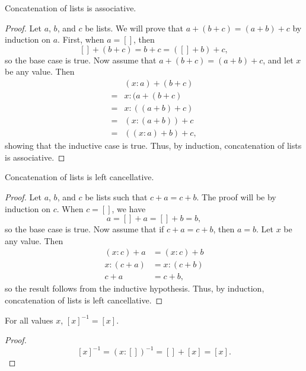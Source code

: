 \documentclass[../../math.tex]{subfiles}
\begin{document}
\begin{instance}
    Concatenation of lists is associative.
\end{instance}
\begin{proof}
    Let $a$, $b$, and $c$ be lists.  We will prove that $a + (b + c) =
    (a + b) + c$ by induction on $a$.  First, when $a = []$, then
    \[
        [] + (b + c) = b + c = ([] + b) + c,
    \]
    so the base case is true.  Now assume that $a + (b + c) = (a +
    b) + c$, and let $x$ be any value.  Then
    \begin{align*}
        &(x : a) + (b + c) \\
        ={}& x : (a + (b + c) \\
        ={}& x : ((a + b) + c) \\
        ={}& (x : (a + b)) + c \\
        ={}& ((x : a) + b) + c,
    \end{align*}
    showing that the inductive case is true.  Thus, by induction, concatenation
    of lists is associative.
\end{proof}

\begin{instance}
    Concatenation of lists is left cancellative.
\end{instance}
\begin{proof}
    Let $a$, $b$, and $c$ be lists such that $c + a = c + b$.  The proof will be
    by induction on $c$.  When $c = []$, we have
    \[
        a = [] + a = [] + b = b,
    \]
    so the base case is true.  Now assume that if $c + a = c + b$, then $a = b$.
    Let $x$ be any value.  Then
    \begin{align*}
        (x : c) + a &= (x : c) + b \\
        x : (c + a) &= x : (c + b) \\
        c + a &= c + b,
    \end{align*}
    so the result follows from the inductive hypothesis.  Thus, by induction,
    concatenation of lists is left cancellative.
\end{proof}

\begin{theorem}
    For all values $x$, $[x]^{-1} = [x]$.
\end{theorem}
\begin{proof}
    \[
        [x]^{-1} = (x : [])^{-1} = [] + [x] = [x].
    \]
\end{proof}
\end{document}
